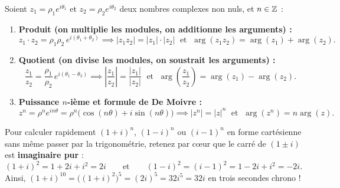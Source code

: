 \begin{theoreme}
Soient $z_1 = \rho_1 e^{i\theta_1}$ et $z_2 = \rho_2 e^{i\theta_2}$ deux nombres complexes non nuls, et $n \in \mathbb{Z}$ :
\begin{enumerate}
    \item \textbf{Produit (on multiplie les modules, on additionne les arguments) :}
    \[
        \boxed{z_1 \cdot z_2 = \rho_1 \rho_2 \, e^{i(\theta_1 + \theta_2)}} \implies |z_1 z_2| = |z_1|\cdot|z_2| \;\text{ et }\; \arg(z_1 z_2) = \arg(z_1) + \arg(z_2).
    \]
    \item \textbf{Quotient (on divise les modules, on soustrait les arguments) :}
    \[
        \boxed{\frac{z_1}{z_2} = \frac{\rho_1}{\rho_2} \, e^{i(\theta_1 - \theta_2)}} \implies \left|\frac{z_1}{z_2}\right| = \frac{|z_1|}{|z_2|} \;\text{ et }\; \arg\left(\frac{z_1}{z_2}\right) = \arg(z_1) - \arg(z_2).
    \]
    \item \textbf{Puissance $n$-ième et formule de De Moivre :}
    \[
        \boxed{z^n = \rho^n e^{in\theta} = \rho^n\bigl(\cos(n\theta) + i\sin(n\theta)\bigr)} \implies |z^n| = |z|^n \;\text{ et }\; \arg(z^n) = n\arg(z).
    \]
\end{enumerate}
\end{theoreme}

\begin{astuce}[L'astuce magique $(1 \pm i)^2 = \pm 2i$ pour les puissances de $(1 \pm i)$]
Pour calculer rapidement $(1 + i)^n$, $(1 - i)^n$ ou $(i - 1)^n$ en forme cartésienne sans même passer par la trigonométrie, retenez par cœur que le carré de $(1 \pm i)$ est \textbf{imaginaire pur} :
\[
    \boxed{(1 + i)^2 = 1 + 2i + i^2 = 2i} \qquad \text{et} \qquad \boxed{(1 - i)^2 = (i - 1)^2 = 1 - 2i + i^2 = -2i}.
\]
Ainsi, $(1 + i)^{10} = \bigl((1 + i)^2\bigr)^5 = (2i)^5 = 32 i^5 = 32i$ en trois secondes chrono !
\end{astuce}

